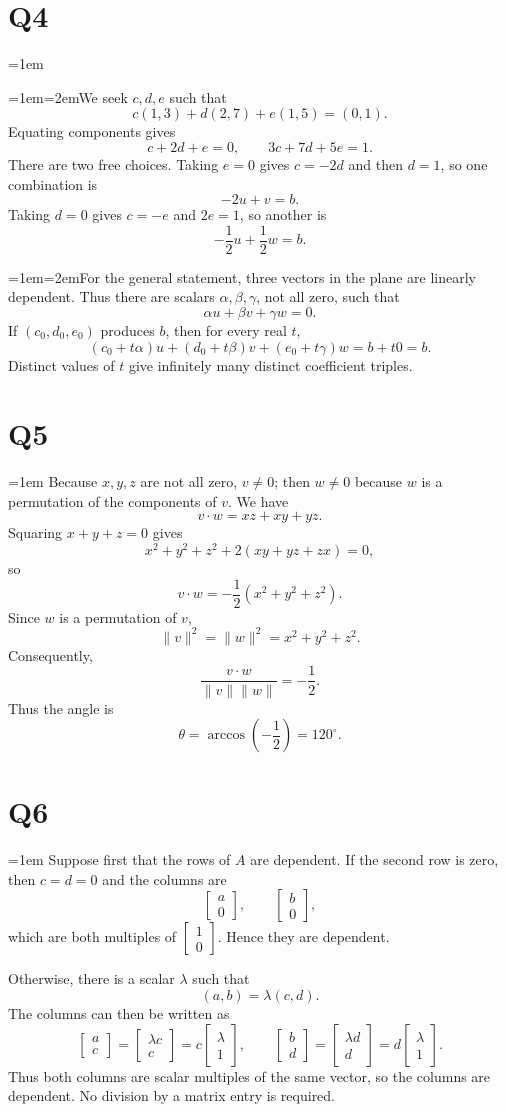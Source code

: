 \documentclass[11pt]{article}
\newcommand{\solutionquestion}[1]{\par\leftskip=0pt\section*{Q#1}\leftskip=1em}
\newcommand{\solutionpart}[1]{\par\smallskip\leftskip=1em\noindent\hangindent=2em\hangafter=1\makebox[1.5em][l]{\textbf{(#1)}}\hspace{0.5em}\ignorespaces}
\begin{document}
\solutionquestion{4}
\solutionpart{i}We seek $c,d,e$ such that
\[
c(1,3)+d(2,7)+e(1,5)=(0,1).
\]
Equating components gives
\[
c+2d+e=0,\qquad 3c+7d+5e=1.
\]
There are two free choices. Taking $e=0$ gives $c=-2d$ and then $d=1$, so one combination is
\[
-2u+v=b.
\]
Taking $d=0$ gives $c=-e$ and $2e=1$, so another is
\[
-\frac12u+\frac12w=b.
\]

\solutionpart{ii}For the general statement, three vectors in the plane are linearly dependent. Thus there are scalars $\alpha,\beta,\gamma$, not all zero, such that
\[
\alpha u+\beta v+\gamma w=0.
\]
If $(c_0,d_0,e_0)$ produces $b$, then for every real $t$,
\[
(c_0+t\alpha)u+(d_0+t\beta)v+(e_0+t\gamma)w=b+t0=b.
\]
Distinct values of $t$ give infinitely many distinct coefficient triples.

\solutionquestion{5}
Because $x,y,z$ are not all zero, $v\ne0$; then $w\ne0$ because $w$ is a permutation of the components of $v$. We have
\[
v\cdot w=xz+xy+yz.
\]
Squaring $x+y+z=0$ gives
\[
x^2+y^2+z^2+2(xy+yz+zx)=0,
\]
so
\[
v\cdot w=-\frac12(x^2+y^2+z^2).
\]
Since $w$ is a permutation of $v$,
\[
\|v\|^2=\|w\|^2=x^2+y^2+z^2.
\]
Consequently,
\[
\frac{v\cdot w}{\|v\|\|w\|}=-\frac12.
\]
Thus the angle is
\[
\theta=\arccos\left(-\frac12\right)=120^\circ.
\]

\solutionquestion{6}
Suppose first that the rows of $A$ are dependent. If the second row is zero, then $c=d=0$ and the columns are
\[
\begin{bmatrix}a\\0\end{bmatrix},
\qquad
\begin{bmatrix}b\\0\end{bmatrix},
\]
which are both multiples of $\begin{bmatrix}1\\0\end{bmatrix}$. Hence they are dependent.

Otherwise, there is a scalar $\lambda$ such that
\[
(a,b)=\lambda(c,d).
\]
The columns can then be written as
\[
\begin{bmatrix}a\\c\end{bmatrix}
=\begin{bmatrix}\lambda c\\c\end{bmatrix}
=c\begin{bmatrix}\lambda\\1\end{bmatrix},
\qquad
\begin{bmatrix}b\\d\end{bmatrix}
=\begin{bmatrix}\lambda d\\d\end{bmatrix}
=d\begin{bmatrix}\lambda\\1\end{bmatrix}.
\]
Thus both columns are scalar multiples of the same vector, so the columns are dependent. No division by a matrix entry is required.
\end{document}

